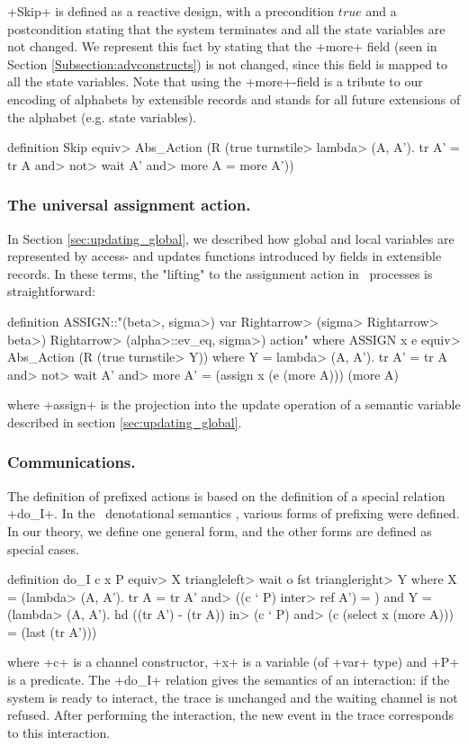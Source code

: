 \documentclass[11pt,a4paper]{article}
\begin{document}
\inlineisar+Skip+ is defined as a reactive design, with a precondition $true$ and
a postcondition stating that the system terminates and all the state variables are not changed. We represent this fact
by stating that the \inlineisar+more+ field (seen in  Section \ref{Subsection:advconstructs}) is not changed, since this field is mapped to all the state variables. Note
that using the \inlineisar+more+-field is a tribute to our encoding of alphabets by extensible records
and stands for all future extensions of the alphabet (e.g. state variables).

\begin{isar}
definition Skip \<equiv>    Abs_Action (R (true \<turnstile>   \<lambda> (A, A'). tr A' = tr A 
                                       \<and> \<not> wait A' \<and>  more A = more A'))
\end{isar}


\subsubsection{The universal assignment action.}\label{sec:assignment_action}
In Section \ref{sec:updating_global}, we described how global and local variables are represented
by access- and updates functions introduced by fields in extensible records. In these terms, the
 "lifting" to the assignment action in \Circus\ processes is straightforward:
\begin{isar}
definition
  ASSIGN::"(\<beta>, \<sigma>) var \<Rightarrow> (\<sigma> \<Rightarrow> \<beta>) \<Rightarrow> (\<alpha>::ev_eq, \<sigma>) action"
where
  ASSIGN x e \<equiv>   Abs_Action (R (true \<turnstile>   Y))
where
 Y = \<lambda> (A, A'). tr A' = tr A \<and>    \<not> wait A' \<and> 
                  more A' = (assign x (e (more A))) (more A)
\end{isar}
where \inlineisar+assign+ is the projection into the update operation of a semantic variable described in section \ref{sec:updating_global}.

\subsubsection{Communications.}
The definition of prefixed actions is based on the definition of a
special relation \inlineisar+do_I+. 
In the \Circus\ denotational semantics \cite{CircusDS},
various forms of prefixing were defined. In our theory, we define one
general form, and the other forms are defined as special cases.
\begin{isar}
definition do_I c x P \<equiv>     X  \<triangleleft> wait o fst \<triangleright>   Y
where
X = (\<lambda> (A, A'). tr A = tr A' \<and>     ((c ` P) \<inter>  ref A') = {})
and
Y = (\<lambda> (A, A'). hd ((tr A') - (tr A)) \<in>      (c ` P) \<and> 
     (c (select x (more A))) = (last (tr A')))
\end{isar}
where \inlineisar+c+ is a channel constructor, \inlineisar+x+ is a variable (of \inlineisar+var+ type) and \inlineisar+P+ is a predicate. The \inlineisar+do_I+ relation gives the semantics of an interaction: if the system is ready to interact, the trace is unchanged and the waiting channel is not refused. After performing the interaction, the new event in the trace corresponds to this interaction. 
\end{document}
